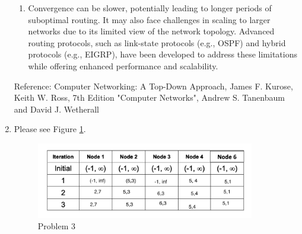 \documentclass{article}
\begin{document}
\begin{enumerate}
\begin{enumerate}
        \item
        Convergence can be slower, potentially leading to longer periods of suboptimal routing. It may also face challenges in scaling to larger networks due to its limited view of the network topology. Advanced routing protocols, such as link-state protocols (e.g., OSPF) and hybrid protocols (e.g., EIGRP), have been developed to address these limitations while offering enhanced performance and scalability.
        
    \end{enumerate}
    Reference:
    Computer Networking: A Top-Down Approach, James F. Kurose, Keith W. Ross, 7th Edition
    \newline
    "Computer Networks", Andrew S. Tanenbaum and David J. Wetherall

    \item
    Please see Figure \ref{fig:frog}.
    \begin{figure}
        \centering
        \includegraphics[width=0.9\textwidth]{h5ex3.png}
        \caption{\label{fig:frog}Problem 3}
    \end{figure}
    

\end{enumerate}
\end{document}
